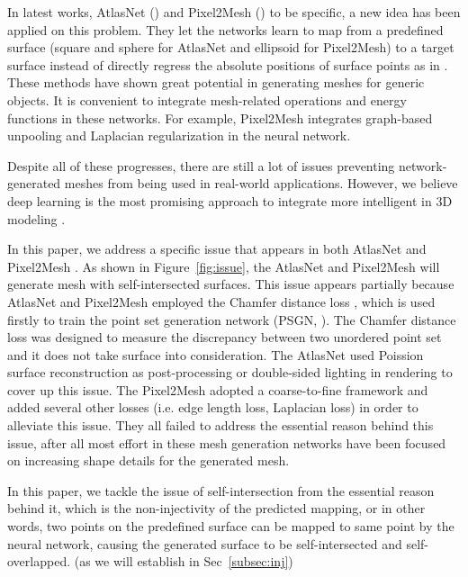 In latest works, AtlasNet (\cite{atlasnet}) and Pixel2Mesh (\cite{pixel2mesh}) to be specific, a new idea has been applied on this problem. They let the networks learn to map from a predefined surface (square and sphere for AtlasNet and ellipsoid for Pixel2Mesh) to a target surface instead of directly regress the absolute positions of surface points as in \cite{PSGN}. These methods have shown great potential in generating meshes for generic objects. It is convenient to integrate mesh-related operations and energy functions in these networks. For example, Pixel2Mesh integrates graph-based unpooling and Laplacian regularization in the neural network.

Despite all of these progresses, there are still a lot of issues preventing network-generated meshes from being used in real-world applications. However, we believe deep learning is the most promising approach to integrate more intelligent in 3D modeling .

 In this paper, we address a specific issue that appears in both AtlasNet \cite{atlasnet} and Pixel2Mesh \cite{pixel2mesh}. As shown in Figure~\ref{fig:issue}, the AtlasNet and Pixel2Mesh will generate mesh with self-intersected surfaces. This issue appears partially because AtlasNet and Pixel2Mesh employed the Chamfer distance loss , which is used firstly to train the point set generation network (PSGN, \cite{PSGN}). The Chamfer distance loss was designed to measure the discrepancy between two unordered point set and it does not take surface into consideration. The AtlasNet used Poission surface reconstruction as post-processing or double-sided lighting in rendering to cover up this issue. The Pixel2Mesh adopted a coarse-to-fine framework and added several other losses (i.e. edge length loss, Laplacian loss) in order to alleviate this issue. They all failed to address the essential reason behind this issue, after all most effort in these mesh generation networks have been focused on increasing shape details for the generated mesh.

In this paper, we tackle the issue of self-intersection from the essential reason behind it, which is the non-injectivity of the predicted mapping, or in other words, two points on the predefined surface can be mapped to same point by the neural network, causing the generated surface to be self-intersected and self-overlapped. (as we will establish in Sec~\ref{subsec:inj})

